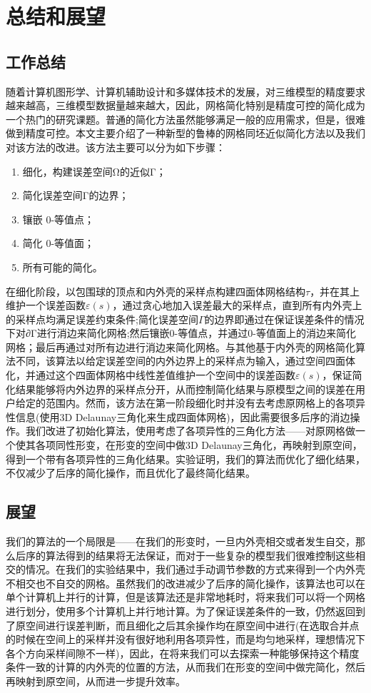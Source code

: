
\chapter{总结和展望}

\section{工作总结}
随着计算机图形学、计算机辅助设计和多媒体技术的发展，对三维模型的精度要求越来越高，三维模型数据量越来越大，因此，网格简化特别是精度可控的简化成为一个热门的研究课题。普通的简化方法虽然能够满足一般的应用需求，但是，很难做到精度可控。本文主要介绍了一种新型的鲁棒的网格同坯近似简化方法以及我们对该方法的改进。该方法主要可以分为如下步骤：
\begin{enumerate}[（1）]
  \item 细化，构建误差空间Ω的近似Γ；
  \item 简化误差空间Γ的边界；
  \item 镶嵌 0-等值点；
  \item 简化 0-等值面；
  \item 所有可能的简化。
\end{enumerate}
在细化阶段，以包围球的顶点和内外壳的采样点构建四面体网格结构$\tau$，并在其上维护一个误差函数$\varepsilon(s)$，通过贪心地加入误差最大的采样点，直到所有内外壳上的采样点均满足误差约束条件;简化误差空间$\Gamma$的边界即通过在保证误差条件的情况下对∂Γ进行消边来简化网格;然后镶嵌0-等值点，并通过0-等值面上的消边来简化网格；最后再通过对所有边进行消边来简化网格。与其他基于内外壳的网格简化算法不同，该算法以给定误差空间的内外边界上的采样点为输入，通过空间四面体化，并通过这个四面体网格中线性差值维护一个空间中的误差函数$\varepsilon(s)$，保证简化结果能够将内外边界的采样点分开，从而控制简化结果与原模型之间的误差在用户给定的范围内。然而，该方法在第一阶段细化时并没有去考虑原网格上的各项异性信息(使用3D Delaunay三角化来生成四面体网格)，因此需要很多后序的消边操作。我们改进了初始化算法，使用考虑了各项异性的三角化方法——对原网格做一个使其各项同性形变，在形变的空间中做3D Delaunay三角化，再映射到原空间，得到一个带有各项异性的三角化结果。实验证明，我们的算法而优化了细化结果，不仅减少了后序的简化操作，而且优化了最终简化结果。
\section{展望}
我们的算法的一个局限是——在我们的形变时，一旦内外壳相交或者发生自交，那么后序的算法得到的结果将无法保证，而对于一些复杂的模型我们很难控制这些相交的情况。在我们的实验结果中，我们通过手动调节参数的方式来得到一个内外壳不相交也不自交的网格。虽然我们的改进减少了后序的简化操作，该算法也可以在单个计算机上并行的计算，但是该算法还是非常地耗时，将来我们可以将一个网格进行划分，使用多个计算机上并行地计算。为了保证误差条件的一致，仍然返回到了原空间进行误差判断，而且细化之后其余操作均在原空间中进行(在选取合并点的时候在空间上的采样并没有很好地利用各项异性，而是均匀地采样，理想情况下各个方向采样间隙不一样)，因此，在将来我们可以去探索一种能够保持这个精度条件一致的计算的内外壳的位置的方法，从而我们在形变的空间中做完简化，然后再映射到原空间，从而进一步提升效率。
